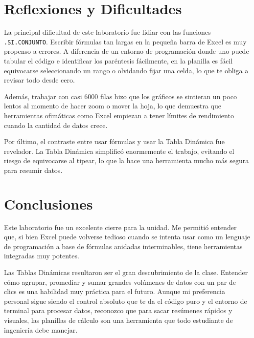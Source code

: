 \documentclass[11pt]{article}
\begin{document}
\section{Reflexiones y Dificultades}

La principal dificultad de este laboratorio fue lidiar con las funciones \texttt{.SI.CONJUNTO}. Escribir fórmulas tan largas en la pequeña barra de Excel es muy propenso a errores. A diferencia de un entorno de programación donde uno puede tabular el código e identificar los paréntesis fácilmente, en la planilla es fácil equivocarse seleccionando un rango o olvidando fijar una celda, lo que te obliga a revisar todo desde cero.

Además, trabajar con casi 6000 filas hizo que los gráficos se sintieran un poco lentos al momento de hacer zoom o mover la hoja, lo que demuestra que herramientas ofimáticas como Excel empiezan a tener límites de rendimiento cuando la cantidad de datos crece.

Por último, el contraste entre usar fórmulas y usar la Tabla Dinámica fue revelador. La Tabla Dinámica simplificó enormemente el trabajo, evitando el riesgo de equivocarse al tipear, lo que la hace una herramienta mucho más segura para resumir datos.

\section{Conclusiones}

Este laboratorio fue un excelente cierre para la unidad. Me permitió entender que, si bien Excel puede volverse tedioso cuando se intenta usar como un lenguaje de programación a base de fórmulas anidadas interminables, tiene herramientas integradas muy potentes.

Las Tablas Dinámicas resultaron ser el gran descubrimiento de la clase. Entender cómo agrupar, promediar y sumar grandes volúmenes de datos con un par de clics es una habilidad muy práctica para el futuro. Aunque mi preferencia personal sigue siendo el control absoluto que te da el código puro y el entorno de terminal para procesar datos, reconozco que para sacar resúmenes rápidos y visuales, las planillas de cálculo son una herramienta que todo estudiante de ingeniería debe manejar.
\end{document}

